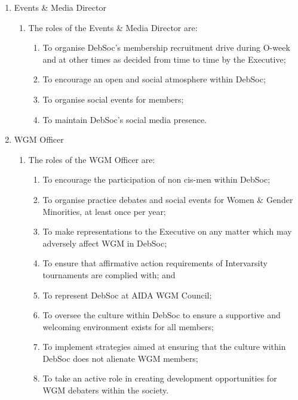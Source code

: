 \begin{enumerate}
\item Events \& Media Director
  \begin{enumerate}
  \item The roles of the Events \& Media Director are:
    \begin{enumerate}
    \item To organise DebSoc’s membership recruitment drive during O-week and at other times as decided from time to time by the Executive;
    \item To encourage an open and social atmosphere within DebSoc;
    \item To organise social events for members;
    \item To maintain DebSoc’s social media presence.
    \end{enumerate}
  \end{enumerate}

\item WGM Officer
  \begin{enumerate}
  \item The roles of the WGM Officer are:
    \begin{enumerate}
    \item To encourage the participation of non cis-men within DebSoc;
    \item To organise practice debates and social events for Women \& Gender Minorities, at least once per year;
    \item To make representations to the Executive on any matter which may adversely affect WGM in DebSoc;
    \item To ensure that affirmative action requirements of Intervarsity tournaments are complied with; and
    \item To represent DebSoc at AIDA WGM Council;
    \item To oversee the culture within DebSoc to ensure a supportive and welcoming environment exists for all members;
    \item To implement strategies aimed at ensuring that the culture within DebSoc does not alienate WGM members;
    \item To take an active role in creating development opportunities for WGM debaters within the society.
    \end{enumerate}
  \end{enumerate}


\end{enumerate}
